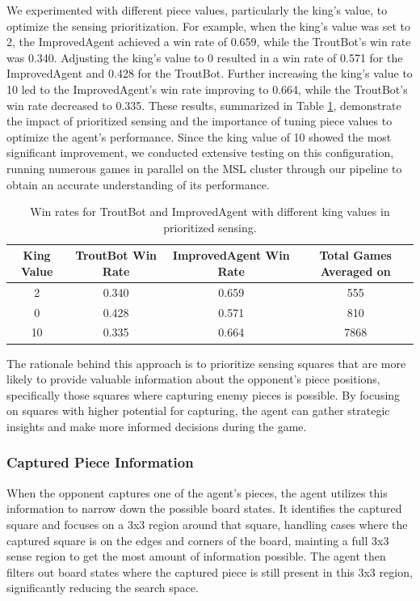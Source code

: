 \documentclass[10pt]{article}
\begin{document}
We experimented with different piece values, particularly the king's value, to optimize the sensing prioritization. For example, when the king's value was set to 2, the ImprovedAgent achieved a win rate of 0.659, while the TroutBot's win rate was 0.340. Adjusting the king's value to 0 resulted in a win rate of 0.571 for the ImprovedAgent and 0.428 for the TroutBot. Further increasing the king's value to 10 led to the ImprovedAgent's win rate improving to 0.664, while the TroutBot's win rate decreased to 0.335. These results, summarized in Table \ref{tab:win_rates}, demonstrate the impact of prioritized sensing and the importance of tuning piece values to optimize the agent's performance. Since the king value of 10 showed the most significant improvement, we conducted extensive testing on this configuration, running numerous games in parallel on the MSL cluster through our pipeline to obtain an accurate understanding of its performance.

\begin{table}[h]
  \centering
  \begin{tabular}{|c|c|c|c|}
  \hline
  \textbf{King Value} & \textbf{TroutBot Win Rate} & \textbf{ImprovedAgent Win Rate} & \textbf{Total Games Averaged on} \\
  \hline
  2 & 0.340 & 0.659 & 555 \\
  \hline
  0 & 0.428 & 0.571 & 810 \\
  \hline
  10 & 0.335 & 0.664 & 7868 \\
  \hline
  \end{tabular}
  \caption{Win rates for TroutBot and ImprovedAgent with different king values in prioritized sensing.}
  \label{tab:win_rates}
\end{table}

The rationale behind this approach is to prioritize sensing squares that are more likely to provide valuable information about the opponent's piece positions, specifically those squares where capturing enemy pieces is possible. By focusing on squares with higher potential for capturing, the agent can gather strategic insights and make more informed decisions during the game.

\subsubsection{Captured Piece Information}
When the opponent captures one of the agent's pieces, the agent utilizes this information to narrow down the possible board states. It identifies the captured square and focuses on a 3x3 region around that square, handling cases where the captured square is on the edges and corners of the board, mainting a full 3x3 sense region to get the most amount of information possible. The agent then filters out board states where the captured piece is still present in this 3x3 region, significantly reducing the search space.
\end{document}
